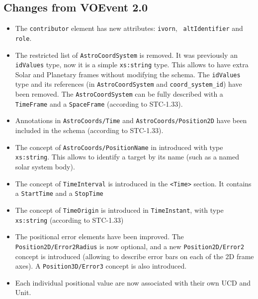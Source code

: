 \documentclass[11pt,a4paper]{ivoa}
\begin{document}
\subsection{Changes from VOEvent 2.0}
\label{appendix:last-changes}
\begin{itemize}
\item The {\tt contributor} element has new attributes: {\tt ivorn}, {\tt
altIdentifier} and {\tt role}.
\item The restricted list of {\tt AstroCoordSystem} is removed. It was
previously an {\tt idValues} type, now it is a simple {\tt xs:string} type.
This allows to have extra Solar and Planetary frames without modifying the
schema. The {\tt idValues} type and its references (in {\tt AstroCoordSystem}
and {\tt coord\_system\_id}) have been removed. The {\tt AstroCoordSystem} can
be fully described with a {\tt TimeFrame} and a {\tt SpaceFrame}  (according to
STC-1.33).
\item Annotations in {\tt AstroCoords/Time} and {\tt AstroCoords/Position2D}
have been included in the schema (according to STC-1.33).
\item The concept of {\tt AstroCoords/PositionName} in introduced with type {\tt
xs:string}. This allows to identify a target by its name (such as a named solar
system body).
\item The concept of {\tt TimeInterval} is introduced in the {\tt <Time>}
section. It contains a {\tt StartTime} and a {\tt StopTime}
\item The concept of {\tt TimeOrigin} is introduced in {\tt TimeInstant}, with
type {\tt xs:string} (according to STC-1.33)
\item The positional error elements have been improved. The {\tt
Position2D/Error2Radius} is now optional, and a new {\tt Position2D/Error2}
concept is introduced (allowing to describe error bars on each of the 2D frame
axes). A {\tt Position3D/Error3} concept is also introduced.
\item Each individual positional value are now associated with their own UCD
and Unit.
\end{itemize}
\end{document}
